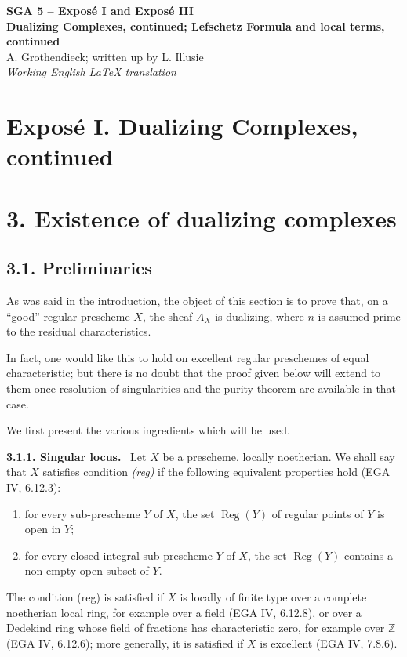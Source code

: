 \documentclass[12pt]{article}
\newcommand{\ZZ}{\mathbb Z}
\newcommand{\Reg}{\operatorname{Reg}}
\newenvironment{statement}[1]{\par\medskip\noindent\textbf{#1.}\ }{\par\medskip}
\begin{document}
\begin{center}
{\Large \textbf{SGA 5 -- Exposé I and Exposé III}}\\[0.4em]
{\large \textbf{Dualizing Complexes, continued; Lefschetz Formula and local terms, continued}}\\[0.3em]
A. Grothendieck; written up by L. Illusie\\[0.4em]
\emph{Working English LaTeX translation}
\end{center}

\section*{Exposé I. Dualizing Complexes, continued}

\section*{3. Existence of dualizing complexes}

\subsection*{3.1. Preliminaries}

As was said in the introduction, the object of this section is to prove that, on a ``good'' regular prescheme $X$, the sheaf $A_X$ is dualizing, where $n$ is assumed prime to the residual characteristics.

In fact, one would like this to hold on excellent regular preschemes of equal characteristic; but there is no doubt that the proof given below will extend to them once resolution of singularities and the purity theorem are available in that case.

We first present the various ingredients which will be used.

\begin{statement}{3.1.1. Singular locus}
Let $X$ be a prescheme, locally noetherian. We shall say that $X$ satisfies condition \emph{(reg)} if the following equivalent properties hold (EGA IV, 6.12.3):
\begin{enumerate}[label=(\roman*)]
\item for every sub-prescheme $Y$ of $X$, the set $\Reg(Y)$ of regular points of $Y$ is open in $Y$;
\item for every closed integral sub-prescheme $Y$ of $X$, the set $\Reg(Y)$ contains a non-empty open subset of $Y$.
\end{enumerate}
The condition (reg) is satisfied if $X$ is locally of finite type over a complete noetherian local ring, for example over a field (EGA IV, 6.12.8), or over a Dedekind ring whose field of fractions has characteristic zero, for example over $\ZZ$ (EGA IV, 6.12.6); more generally, it is satisfied if $X$ is excellent (EGA IV, 7.8.6).
\end{statement}
\end{document}
